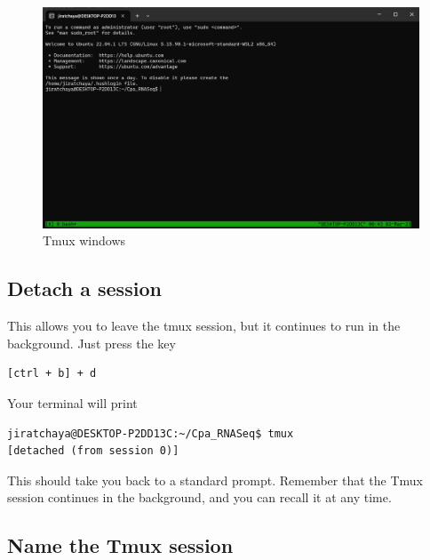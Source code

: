 \documentclass[
  letterpaper,
  DIV=11,
  numbers=noendperiod]{scrreprt}
\begin{document}
\begin{figure}

{\centering \includegraphics{./assets/10_tmux_simple.png}

}

\caption{Tmux windows}

\end{figure}

\hypertarget{detach-a-session}{%
\subsection*{Detach a session}\label{detach-a-session}}

This allows you to leave the tmux session, but it continues to run in
the background. Just press the key

\begin{verbatim}
[ctrl + b] + d
\end{verbatim}

Your terminal will print

\begin{verbatim}
jiratchaya@DESKTOP-P2DD13C:~/Cpa_RNASeq$ tmux
[detached (from session 0)]
\end{verbatim}

This should take you back to a standard prompt. Remember that the Tmux
session continues in the background, and you can recall it at any time.

\hypertarget{name-the-tmux-session}{%
\subsection*{Name the Tmux session}\label{name-the-tmux-session}}
\end{document}
